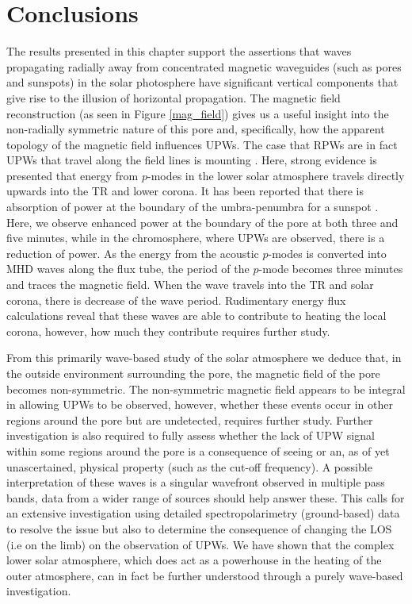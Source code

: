 \section{Conclusions}
\label{sect3}

	The results presented in this chapter support the assertions that waves propagating radially away from concentrated magnetic waveguides (such as pores and sunspots) in the solar photosphere have significant vertical components that give rise to the illusion of horizontal propagation.
	The magnetic field reconstruction (as seen in Figure \ref{mag_field}) gives us a useful insight into the non-radially symmetric nature of this pore and, specifically, how the apparent topology of the magnetic field influences UPWs.
	The case that RPWs are in fact UPWs that travel along the field lines is mounting \citep{Bloomfiel2008,Jess2013}.
	Here, strong evidence is presented that energy from $p$-modes in the lower solar atmosphere travels directly upwards into the TR and lower corona.
	It has been reported that there is absorption of power at the boundary of the umbra-penumbra for a sunspot \citep[e.g.][]{Gosain2011}.
	Here, we observe enhanced power at the boundary of the pore at both three and  five minutes, while in the chromosphere, where UPWs are observed, there is a reduction of power.
	As the energy from the acoustic $p$-modes is converted into MHD waves along the flux tube, the period of the $p$-mode becomes three minutes and traces the magnetic field.
	When the wave travels into the TR and solar corona, there is decrease of the wave period.
	Rudimentary energy flux calculations reveal that these waves are able to contribute to heating the local corona, however, how much they contribute requires further study.

	From this primarily wave-based study of the solar atmosphere we deduce that, in the outside environment surrounding the pore, the magnetic field of the pore becomes non-symmetric.
	The non-symmetric magnetic field appears to be integral in allowing UPWs to be observed, however, whether these events occur in other regions around the pore but are undetected, requires further study.
	Further investigation is also required to fully assess whether the lack of UPW signal within some regions around the pore is a consequence of seeing or an, as of yet unascertained, physical property (such as the cut-off frequency).
	A possible interpretation of these waves is a singular wavefront observed in multiple pass bands, data from a wider range of sources should help answer these.
	This calls for an extensive investigation using detailed spectropolarimetry (ground-based) data to resolve the issue but also to determine the consequence of changing the LOS (i.e on the limb) on the observation of UPWs.
	We have shown that the complex lower solar atmosphere, which does act as a powerhouse in the heating of the outer atmosphere, can in fact be further understood through a purely wave-based investigation.
